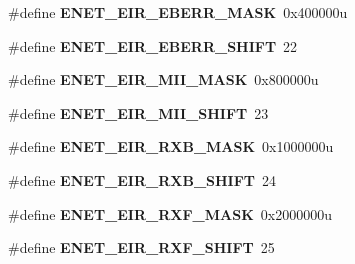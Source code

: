 \begin{DoxyCompactItemize}
\item 
\hypertarget{group___e_n_e_t___register___masks_ga3f96770a7d989e647572c6dfb8c512fc}{}\#define {\bfseries E\+N\+E\+T\+\_\+\+E\+I\+R\+\_\+\+E\+B\+E\+R\+R\+\_\+\+M\+A\+S\+K}~0x400000u\label{group___e_n_e_t___register___masks_ga3f96770a7d989e647572c6dfb8c512fc}

\item 
\hypertarget{group___e_n_e_t___register___masks_gab32cc5037fa08d0be050eaa706ac2822}{}\#define {\bfseries E\+N\+E\+T\+\_\+\+E\+I\+R\+\_\+\+E\+B\+E\+R\+R\+\_\+\+S\+H\+I\+F\+T}~22\label{group___e_n_e_t___register___masks_gab32cc5037fa08d0be050eaa706ac2822}

\item 
\hypertarget{group___e_n_e_t___register___masks_gaa7950e8d1394fd92eb09a2ce4623ab83}{}\#define {\bfseries E\+N\+E\+T\+\_\+\+E\+I\+R\+\_\+\+M\+I\+I\+\_\+\+M\+A\+S\+K}~0x800000u\label{group___e_n_e_t___register___masks_gaa7950e8d1394fd92eb09a2ce4623ab83}

\item 
\hypertarget{group___e_n_e_t___register___masks_gad724bdc9149fc578f9c331bdfcef004f}{}\#define {\bfseries E\+N\+E\+T\+\_\+\+E\+I\+R\+\_\+\+M\+I\+I\+\_\+\+S\+H\+I\+F\+T}~23\label{group___e_n_e_t___register___masks_gad724bdc9149fc578f9c331bdfcef004f}

\item 
\hypertarget{group___e_n_e_t___register___masks_gaf8eb82815708cb73c87988dea057aa19}{}\#define {\bfseries E\+N\+E\+T\+\_\+\+E\+I\+R\+\_\+\+R\+X\+B\+\_\+\+M\+A\+S\+K}~0x1000000u\label{group___e_n_e_t___register___masks_gaf8eb82815708cb73c87988dea057aa19}

\item 
\hypertarget{group___e_n_e_t___register___masks_gad60f05312b15d4abba4d24862c5acbcd}{}\#define {\bfseries E\+N\+E\+T\+\_\+\+E\+I\+R\+\_\+\+R\+X\+B\+\_\+\+S\+H\+I\+F\+T}~24\label{group___e_n_e_t___register___masks_gad60f05312b15d4abba4d24862c5acbcd}

\item 
\hypertarget{group___e_n_e_t___register___masks_ga2a20a0e36978d9064e91cce092593fed}{}\#define {\bfseries E\+N\+E\+T\+\_\+\+E\+I\+R\+\_\+\+R\+X\+F\+\_\+\+M\+A\+S\+K}~0x2000000u\label{group___e_n_e_t___register___masks_ga2a20a0e36978d9064e91cce092593fed}

\item 
\hypertarget{group___e_n_e_t___register___masks_ga7b2d30f7f3e517d68feba7edd38c0c9c}{}\#define {\bfseries E\+N\+E\+T\+\_\+\+E\+I\+R\+\_\+\+R\+X\+F\+\_\+\+S\+H\+I\+F\+T}~25\label{group___e_n_e_t___register___masks_ga7b2d30f7f3e517d68feba7edd38c0c9c}


\end{DoxyCompactItemize}
